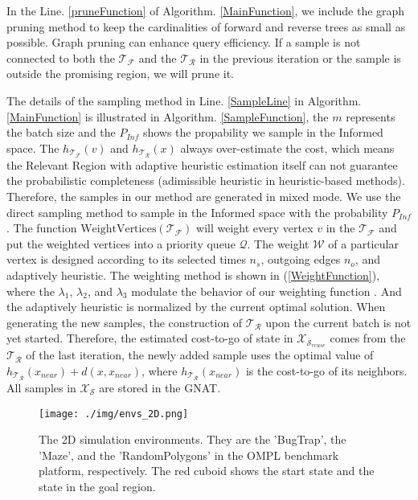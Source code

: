 In the Line. \ref{pruneFunction} of Algorithm. \ref{MainFunction}, we include the graph pruning method to keep the cardinalities of forward and reverse trees as small as possible.
Graph pruning can enhance query efficiency.
If a sample is not connected to both the $\mathcal{T}_{\mathcal{F}}$ and the $\mathcal{T}_{\mathcal{R}}$ in the previous iteration or the sample is outside the promising region, we will prune it.

The details of the sampling method in Line. \ref{SampleLine} in Algorithm. \ref{MainFunction} is illustrated in Algorithm. \ref{SampleFunction}, the $m$ represents the batch size and the $P_{Inf}$ shows the propability we sample in the Informed space.
The $h_{\mathcal{T}_{\mathcal{F}}}(v)$ and $h_{\mathcal{T}_{\mathcal{R}}}(x)$ always over-estimate the cost, which means the Relevant Region with adaptive heuristic estimation itself can not guarantee the probabilistic completeness (adimissible heuristic in heuristic-based methods). 
Therefore, the samples in our method are generated in mixed mode. 
We use the direct sampling method to sample in the Informed space with the probability $P_{Inf}$. 
The function $\text{WeightVertices}(\mathcal{T}_{\mathcal{F}})$ will weight every vertex $v$ in the $\mathcal{T}_{\mathcal{F}}$ and put the weighted vertices into a priority queue $\mathcal{Q}$. 
The weight $\mathcal{W}$ of a particular vertex is designed according to its selected times $n_{s}$, outgoing edges $n_{o}$, and adaptively heuristic.
The weighting method is shown in (\ref{WeightFunction}), where the $\lambda_1$, $\lambda_2$, and $\lambda_3$ modulate the behavior of our weighting function \cite{joshi2020relevant}.
And the adaptively heuristic is normalized by the current optimal solution.
When generating the new samples, the construction of $\mathcal{T}_{\mathcal{R}}$ upon the current batch is not yet started.
Therefore, the estimated cost-to-go of state in $\mathcal{X}_{\mathcal{S}_{reuse}}$ comes from the $\mathcal{T}_{\mathcal{R}}$ of the last iteration, 
the newly added sample uses the optimal value of $h_{\mathcal{T}_{\mathcal{R}}}(x_{near}) + d(x, x_{near})$, where $h_{\mathcal{T}_{\mathcal{R}}}(x_{near})$ is the cost-to-go of its neighbors.
All samples in $\mathcal{X}_{\mathcal{S}}$ are stored in the GNAT.




\begin{figure}[t]
    \centering
    \texttt{[image: ./img/envs\_2D.png]}
    \caption{The 2D simulation environments. They are the 'BugTrap', the 'Maze', and the 'RandomPolygons' in the OMPL benchmark platform, respectively. The red cuboid shows the start state and the state in the goal region.}
    \label{SimulationEnvironments_2D}
\end{figure}

